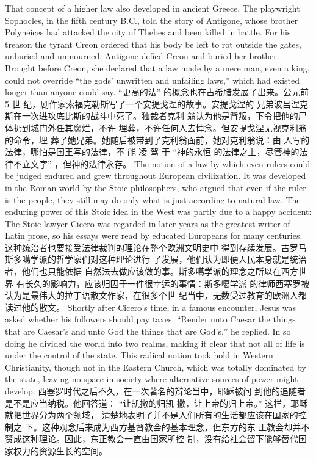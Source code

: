\begin{paracol}{2}
That concept of a higher law also developed in ancient Greece.
The playwright Sophocles, in the fifth century B.C., told the
story of Antigone, whose brother Polyneices had attacked the
city of Thebes and been killed in battle. For his treason the
tyrant Creon ordered that his body be left to rot outside the
gates, unburied and unmourned. Antigone defied Creon and
buried her brother. Brought before Creon, she declared that a
law made by a mere man, even a king, could not override ``the
gods' unwritten and unfailing laws,'' which had existed longer
than anyone could say.
\switchcolumn
“更高的法” 的概念也在古希腊发展了出来。公元前5 世
纪，剧作家索福克勒斯写了一个安提戈涅的故事。安提戈涅的
兄弟波吕涅克斯在一次进攻底比斯的战斗中死了。独裁者克利
翁认为他是背叛，下令把他的尸体扔到城门外任其腐烂，不许
埋葬，不许任何人去悼念。但安提戈涅无视克利翁的命令，埋
葬了她兄弟。她随后被带到了克利翁面前，她对克利翁说：由
人写的法律，哪怕是国王写的法律，不 能 凌 驾 于 “神的永恒
的法律之上，尽管神的法律不立文字” ，但神的法律永存。
\switchcolumn*
The notion of a law by which even rulers could be judged endured and grew throughout European civilization. It was developed in the Roman world by the Stoic philosophers, who
argued that even if the ruler is the people, they still may do only
what is just according to natural law. The enduring power of
this Stoic idea in the West was partly due to a happy accident:
The Stoic lawyer Cicero was regarded in later years as the greatest writer of Latin prose, so his essays were read by educated Europeans for many centuries.
\switchcolumn
这种统治者也要接受法律裁判的理论在整个欧洲文明史中
得到存续发展。古罗马斯多噶学派的哲学家们对这种理论进行
了发展，他们认为即便人民本身就是统治者，他们也只能依据
自然法去做应该做的事。斯多噶学派的理念之所以在西方世界
有长久的影响力，应该归因于一件很幸运的事情：斯多噶学派
的律师西塞罗被认为是最伟大的拉丁语散文作家，在很多个世
纪当中，无数受过教育的欧洲人都读过他的散文。
\switchcolumn*
Shortly after Cicero's time, in a famous encounter, Jesus was
asked whether his followers should pay taxes. ``Render unto
Caesar the things that are Caesar's and unto God the things
that are God's,'' he replied. In so doing he divided the world
into two realms, making it clear that not all of life is under the
control of the state. This radical notion took hold in Western
Christianity, though not in the Eastern Church, which was totally dominated by the state, leaving no space in society where
alternative sources of power might develop.
\switchcolumn
西塞罗时代之后不久，在一次著名的辩论当中，耶稣被问
到他的追随者是不是应当纳税。他回答道： “让凯撒的归凯
撒，让上帝的归上帝。” 这样，耶稣就把世界分为两个领域，
清楚地表明了并不是人们所有的生活都应该在国家的控制之
下。这种观念后来成为西方基督教会的基本理念，但东方的东
正教会却并不赞成这种理论。因此，东正教会一直由国家所控
制，没有给社会留下能够替代国家权力的资源生长的空间。


\end{paracol}
